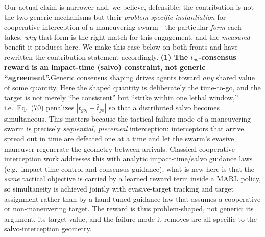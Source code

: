 \documentclass[11pt]{article}
\begin{document}
\medskip\noindent Our actual claim is narrower and, we believe, defensible: the
contribution is not the two generic mechanisms but their \emph{problem-specific
instantiation} for cooperative interception of a maneuvering swarm---the particular
\emph{form} each takes, \emph{why} that form is the right match for this engagement, and
the \emph{measured} benefit it produces here. We make this case below on both fronts and
have rewritten the contribution statement accordingly.
\medskip\noindent\textbf{(1) The $t_{go}$-consensus reward is an impact-time (salvo)
constraint, not generic ``agreement''.}\quad Generic consensus shaping drives agents
toward \emph{any} shared value of some quantity. Here the shaped quantity is deliberately
the time-to-go, and the target is not merely ``be consistent'' but ``strike within one
lethal window,'' i.e.\ Eq.~(70) penalizes $|t_{go_i}-\bar t_{go}|$ so that a distributed
salvo becomes simultaneous. This matters because the tactical failure mode of a
maneuvering swarm is precisely \emph{sequential, piecemeal} interception: interceptors
that arrive spread out in time are defeated one at a time and let the swarm's evasive
maneuver regenerate the geometry between arrivals. Classical cooperative-interception
work addresses this with analytic impact-time/salvo guidance laws
(e.g.\ impact-time-control and consensus guidance); what is new here is that the
\emph{same} tactical objective is carried by a learned reward term inside a MARL policy,
so simultaneity is achieved jointly with evasive-target tracking and target assignment
rather than by a hand-tuned guidance law that assumes a cooperative or non-maneuvering
target. The reward is thus problem-shaped, not generic: its argument, its target value,
and the failure mode it removes are all specific to the salvo-interception geometry.
\end{document}
